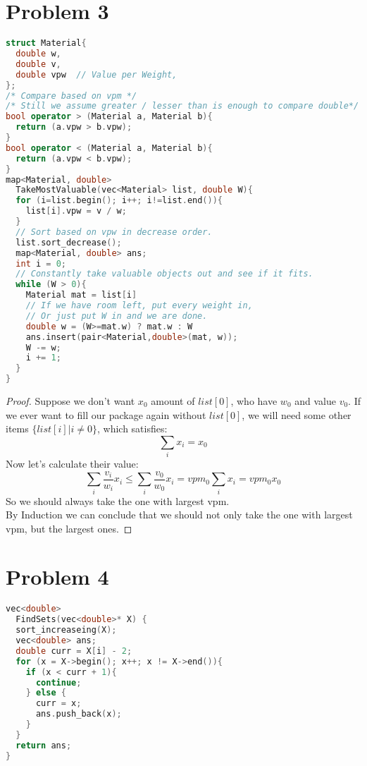 \documentclass{article}
\begin{document}
\section*{Problem 3}
\begin{lstlisting}[language = C++]
struct Material{
  double w,
  double v,
  double vpw  // Value per Weight,
};
/* Compare based on vpm */
/* Still we assume greater / lesser than is enough to compare double*/
bool operator > (Material a, Material b){
  return (a.vpw > b.vpw);
}
bool operator < (Material a, Material b){
  return (a.vpw < b.vpw);
}
map<Material, double>
  TakeMostValuable(vec<Material> list, double W){
  for (i=list.begin(); i++; i!=list.end()){
    list[i].vpw = v / w;
  }
  // Sort based on vpw in decrease order.
  list.sort_decrease();
  map<Material, double> ans;
  int i = 0;
  // Constantly take valuable objects out and see if it fits.
  while (W > 0){
    Material mat = list[i]
    // If we have room left, put every weight in,
    // Or just put W in and we are done.
    double w = (W>=mat.w) ? mat.w : W
    ans.insert(pair<Material,double>(mat, w));
    W -= w;
    i += 1;
  }
}
\end{lstlisting}
\begin{proof}
  Suppose we don't want $x_0$ amount of $list[0]$, who have $w_0$ and value $v_0$. If we ever want to fill our package again without $list[0]$, we will need some other items $\{list[i] | i \neq 0\}$, which satisfies:
  $$\sum_i x_i = x_0$$
  Now let's calculate their value:
  $$\sum_i \frac{v_i}{w_i}x_i \leq \sum_i \frac{v_0}{w_0}x_i = vpm_0\sum_i{x_i} = vpm_0x_0$$
  So we should always take the one with largest vpm. \\
  By Induction we can conclude that we should not only take the one with largest vpm, but the largest ones.
\end{proof}
\section*{Problem 4}
\begin{lstlisting}[language = C++]
vec<double>
  FindSets(vec<double>* X) {
  sort_increaseing(X);
  vec<double> ans;
  double curr = X[i] - 2;
  for (x = X->begin(); x++; x != X->end()){
    if (x < curr + 1){
      continue;
    } else {
      curr = x;
      ans.push_back(x);
    }
  }
  return ans;
}
\end{lstlisting}
\end{document}
